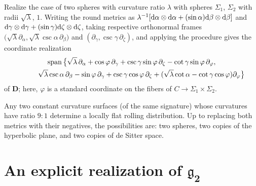 \documentclass[pdftex]{sigma}
\newcommand{\mbD}{\mathbf{D}}
\newcommand{\mfg} {\mathfrak{g}}
\numberwithin{equation}{section}
\begin{document}
\begin{Example}\label{example:two-spheres}
Realize the case of two spheres with curvature ratio $\lambda$ with spheres $\Sigma_1$, $\Sigma_2$ with radii $\sqrt{\lambda}$, $1$. Writing the round metrics as $\lambda^{-1} [{\rm d}\alpha \otimes {\rm d}\alpha + (\sin \alpha) {\rm d}\beta \otimes {\rm d}\beta]$ and ${\rm d}\gamma \otimes {\rm d}\gamma + (\sin \gamma) {\rm d}\zeta \otimes {\rm d}\zeta$, taking respective orthonormal frames $\big(\sqrt{\lambda} \partial_{\alpha}, \sqrt{\lambda} \csc \alpha \,\partial_{\beta}\big)$ and $(\partial_{\gamma}, \csc \gamma \,\partial_{\zeta})$, and applying the procedure gives the coordinate realization
\begin{gather*}
		\operatorname{span}\big\{
			\sqrt\lambda \,\partial_{\alpha}
				+ \cos \varphi \,\partial_{\gamma}
				+ \csc \gamma \sin \varphi \,\partial_{\zeta}
				- \cot \gamma \sin \varphi \,\partial_{\varphi}, \\
\hphantom{\operatorname{span}\big\{}{}\sqrt\lambda \csc \alpha \,\partial_{\beta}
				- \sin \varphi \,\partial_{\gamma}
				+ \csc \gamma \cos \varphi \,\partial_{\zeta}
				+ (\sqrt\lambda \cot \alpha - \cot \gamma \cos \varphi) \partial_{\varphi}
		\big\}
\end{gather*}
of $\mbD$; here, $\varphi$ is a standard coordinate on the fibers of $C \to \Sigma_1 \times \Sigma_2$.
\end{Example}

\begin{Remark}
Any two constant curvature surfaces (of the same signature) whose curvatures have ratio $9:1$ determine a locally flat rolling distribution. Up to replacing both metrics with their negatives, the possibilities are: two spheres, two copies of the hyperbolic plane, and two copies of de Sitter space.
\end{Remark}


\appendix
\appendixpage
\section[An explicit realization of $\mfg_2$]{An explicit realization of $\boldsymbol{\mfg_2}$}\label{appendix:tables}
\end{document}
